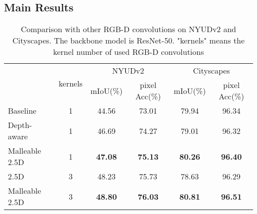 \documentclass[runningheads]{llncs}
\begin{document}
\subsection{Main Results}
\begin{table}[tbp]
  \begin{center}
  \caption{Comparison with other RGB-D convolutions on NYUDv2 and Cityscapes.
  The backbone model is ResNet-50.
  "kernels" means the kernel number of used RGB-D convolutions
  }
  \label{table:conv_compare}
  \setlength{\tabcolsep}{5.5pt}
  \begin{tabular}{lccccc}
    \hline\noalign{\smallskip}
    \multirow{2}{*}{Method} & \multirow{2}{*}{kernels} &
    \multicolumn{2}{c}{NYUDv2} & \multicolumn{2}{c}{Cityscapes} \\
     & & mIoU(\%) & pixel Acc(\%) & mIoU(\%) & pixel Acc(\%)\\
    \noalign{\smallskip}
    \hline
    \noalign{\smallskip}
    Baseline      & 1 & 44.56  & 73.01 & 79.94  & 96.34\\
    \noalign{\smallskip}
    \hline
    \noalign{\smallskip}
    Depth-aware\cite{DepthAware}   & 1 & 46.69 & 74.27 & 79.01 & 96.32 \\
    Malleable 2.5D  & 1 & \textbf{47.08} & \textbf{75.13} & \textbf{80.26} & \textbf{96.40} \\
    \noalign{\smallskip}
    \hline
    \noalign{\smallskip}
    2.5D\cite{2_5D}          & 3 & 48.23 & 75.73 & 78.63 & 96.29 \\
    Malleable 2.5D  & 3 & \textbf{48.80} & \textbf{76.03} & \textbf{80.81} & \textbf{96.51}\\
    \hline
  \end{tabular}
  \end{center}
\end{table}
\end{document}
